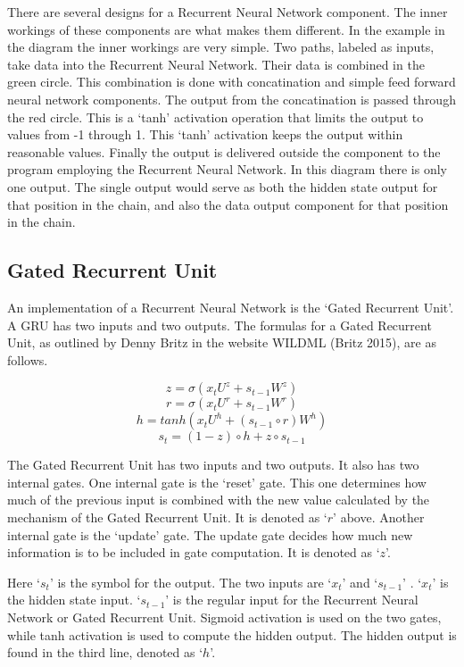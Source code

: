There are several designs for a Recurrent Neural Network component. The inner workings of these components are what makes them different. In the example in the diagram the inner workings are very simple. Two paths, labeled as inputs, take data into the Recurrent Neural Network. Their data is combined in the green circle. This combination is done with concatination and simple feed forward neural network components. The output from the concatination is passed through the red circle. This is a `tanh' activation operation that limits the output to values from -1 through 1. This `tanh' activation keeps the output within reasonable values. Finally the output is delivered outside the component to the program employing the Recurrent Neural Network. In this diagram there is only one output. The single output would serve as both the hidden state output for that position in the chain, and also the data output component for that position in the chain.



\subsection*{Gated Recurrent Unit}
An implementation of a Recurrent Neural Network is the `Gated Recurrent Unit'. A \ac{GRU} has two inputs and two outputs. The formulas for a Gated Recurrent Unit, as outlined by Denny Britz in the website WILDML (Britz 2015)\cite{2015Britz}, are as follows.

\begin{minipage}{5in}

$$ z =\sigma(x_tU^z + s_{t-1} W^z) $$  
$$ r =\sigma(x_t U^r +s_{t-1} W^r) $$  
$$ h = tanh(x_t U^h + (s_{t-1} \circ r) W^h) $$  
$$ s_t = (1 - z) \circ h + z \circ s_{t-1} $$  

\end{minipage}

\bigskip \bigskip

The Gated Recurrent Unit has two inputs and two outputs. It also has two internal gates. One internal gate is the `reset' gate. This one determines how much of the previous input is combined with the new value calculated by the mechanism of the Gated Recurrent Unit. It is denoted as `$r$' above. Another internal gate is the `update' gate. The update gate decides how much new information is to be included in gate computation. It is denoted as `$z$'.

Here `$ s_t $' is the symbol for the output. The two inputs are `$ x_t $' and `$ s_{t-1} $' . `$ x_t $' is the hidden state input. `$ s_{t-1} $' is the regular input for the Recurrent Neural Network or Gated Recurrent Unit. Sigmoid activation is used on the two gates, while tanh activation is used to compute the hidden output. The hidden output is found in the third line, denoted as `$h$'.


